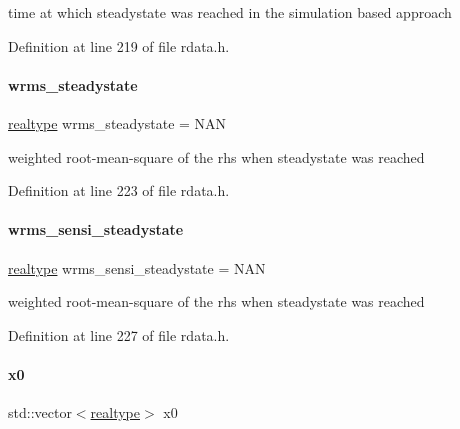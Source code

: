 time at which steadystate was reached in the simulation based approach 

Definition at line 219 of file rdata.\+h.

\mbox{\label{classamici_1_1_return_data_ad044a0dd6c510ee74c8122767c25d6cb}} 
\paragraph{\texorpdfstring{wrms\_steadystate}{wrms\_steadystate}}
{\footnotesize\ttfamily \mbox{\hyperlink{namespaceamici_a1bdce28051d6a53868f7ccbf5f2c14a3}{realtype}} wrms\+\_\+steadystate = N\+AN}

weighted root-\/mean-\/square of the rhs when steadystate was reached 

Definition at line 223 of file rdata.\+h.

\mbox{\label{classamici_1_1_return_data_ae10f7eece540838884f18b379083fc8f}} 
\paragraph{\texorpdfstring{wrms\_sensi\_steadystate}{wrms\_sensi\_steadystate}}
{\footnotesize\ttfamily \mbox{\hyperlink{namespaceamici_a1bdce28051d6a53868f7ccbf5f2c14a3}{realtype}} wrms\+\_\+sensi\+\_\+steadystate = N\+AN}

weighted root-\/mean-\/square of the rhs when steadystate was reached 

Definition at line 227 of file rdata.\+h.

\mbox{\label{classamici_1_1_return_data_a9089beccffa9671a052e3065166dce53}} 
\paragraph{\texorpdfstring{x0}{x0}}
{\footnotesize\ttfamily std\+::vector$<$\mbox{\hyperlink{namespaceamici_a1bdce28051d6a53868f7ccbf5f2c14a3}{realtype}}$>$ x0}

